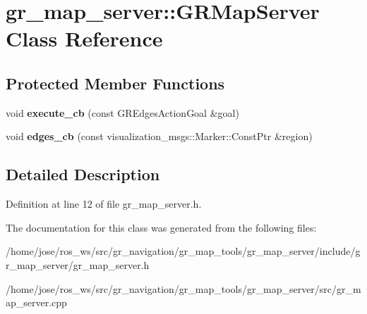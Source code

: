 \hypertarget{classgr__map__server_1_1GRMapServer}{}\section{gr\+\_\+map\+\_\+server\+:\+:G\+R\+Map\+Server Class Reference}
\label{classgr__map__server_1_1GRMapServer}
\subsection*{Protected Member Functions}
\begin{DoxyCompactItemize}
\item 
\mbox{\label{classgr__map__server_1_1GRMapServer_aaa0f92a0c22acf23acf8185e8b6863a5}} 
void {\bfseries execute\+\_\+cb} (const G\+R\+Edges\+Action\+Goal \&goal)
\item 
\mbox{\label{classgr__map__server_1_1GRMapServer_a5e562d013ad4f53c4fb5442c7df65519}} 
void {\bfseries edges\+\_\+cb} (const visualization\+\_\+msgs\+::\+Marker\+::\+Const\+Ptr \&region)
\end{DoxyCompactItemize}


\subsection{Detailed Description}


Definition at line 12 of file gr\+\_\+map\+\_\+server.\+h.



The documentation for this class was generated from the following files\+:\begin{DoxyCompactItemize}
\item 
/home/jose/ros\+\_\+ws/src/gr\+\_\+navigation/gr\+\_\+map\+\_\+tools/gr\+\_\+map\+\_\+server/include/gr\+\_\+map\+\_\+server/gr\+\_\+map\+\_\+server.\+h\item 
/home/jose/ros\+\_\+ws/src/gr\+\_\+navigation/gr\+\_\+map\+\_\+tools/gr\+\_\+map\+\_\+server/src/gr\+\_\+map\+\_\+server.\+cpp\end{DoxyCompactItemize}
